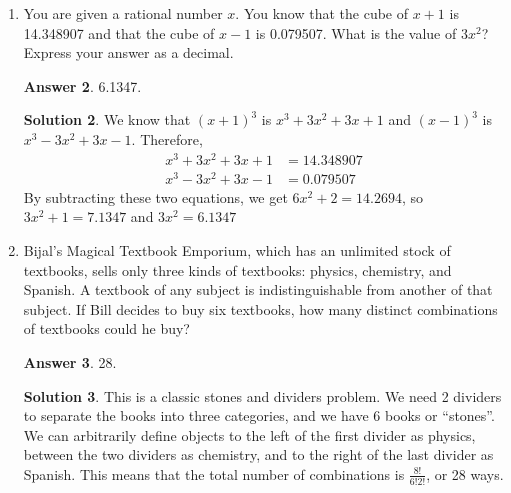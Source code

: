 \documentclass[11pt]{article}
\theoremstyle{definition}
\newtheorem*{solution}{Solution}
\newtheorem*{answer}{Answer}
\begin{document}
\begin{enumerate}
\begin{answer}
29.
\end{answer}
\begin{solution}
We repeatedly count the number of ways to get to each point in the grid, working our way upward. We do this by adding the number of ways to get to the point below and the number of ways to get to the point to the left in order to get the number of ways to get to our point. However, we do not count the points at (1,4) and (1,3), as we cannot go there. We start at (0,0) with a value of 1. (Draw a diagram for this) We then repeatedly count the number of paths to each point: the paths to (0,1) is the paths to (0,0) plus the paths to (-1,1), which is $1+0$ = 1. The paths to (1,0) is the paths to (0,0) plus the paths to (1,-1), which is $1+0$ = 1. The paths to (1,1) is the paths to (0,1) plus the paths to (1,0), which is $1+1$ = 2. We keep doing this for $0 \le x \le 3$ and $0 \le y \le 5$, until we get 7 ways to (2,5) and 22 ways to (3,4). This means that the number of ways to (3,5) is therefore $7+22 = \boxed{29}$ ways.
\end{solution}

\item You are given a rational number $x$. You know that the cube of $x+1$ is 14.348907 and that the cube of $x-1$ is 0.079507. What is the value of $3x^2$? Express your answer as a decimal.

\begin{answer}
6.1347.
\end{answer}
\begin{solution}
We know that $(x+1)^3$ is $x^3 + 3{x}^2 + 3x + 1$ and $(x-1)^3$ is $x^3 - 3{x}^2 + 3x - 1$. Therefore,
\begin{align*}
x^3 + 3{x}^2 + 3x + 1 &= 14.348907 \\
x^3 - 3{x}^2 + 3x - 1 &= 0.079507
\end{align*}
By subtracting these two equations, we get $6{x}^2 + 2 = 14.2694$, so $3{x}^2 + 1 = 7.1347$ and $3{x}^2 = \boxed{6.1347}$
\end{solution}

\item Bijal's Magical Textbook Emporium, which has an unlimited stock of textbooks, sells only three kinds of textbooks: physics, chemistry, and Spanish. A textbook of any subject is indistinguishable from another of that subject. If Bill decides to buy six textbooks, how many distinct combinations of textbooks could he buy?

\begin{answer}
28.
\end{answer}
\begin{solution}
This is a classic stones and dividers problem. We need 2 dividers to separate the books into three categories, and we have 6 books or "`stones"'. We can arbitrarily define objects to the left of the first divider as physics, between the two dividers as chemistry, and to the right of the last divider as Spanish. This means that the total number of combinations is $\frac{8!}{6!2!}$, or 28 ways.
\end{solution}


\end{enumerate}
\end{document}
